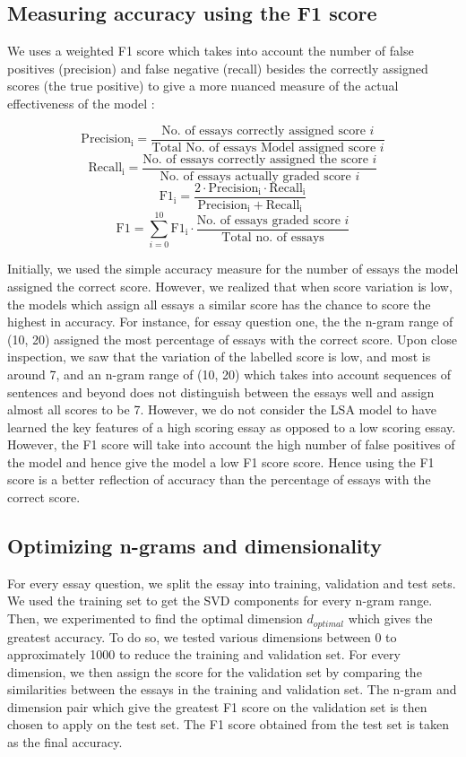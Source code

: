 \documentclass[10pt,letterpaper]{article}
\begin{document}
\subsection{Measuring accuracy using the F1 score}

We uses a weighted F1 score which takes into account the number of false positives (precision) and false negative (recall) besides the correctly assigned scores (the true positive) to give a more nuanced measure of the actual effectiveness of the model \cite{islam2010automated}: 

$$\mathrm{Precision_i} = \frac {\textrm{No. of essays correctly assigned score } i} {\textrm{Total No. of essays Model assigned score } i}$$
$$\mathrm{Recall_i} = \frac{\textrm{No. of essays correctly assigned the score } i}{\textrm{No. of essays actually graded score } i}$$
$$\mathrm{F1_i} = \frac{\mathrm{2 \cdot \mathrm{Precision_i} \cdot \mathrm{Recall_i}}}{\mathrm{Precision_i + Recall_i}}$$
$$\mathrm{F1} = \sum_{i=0}^{10} \mathrm{F1_i} \cdot \frac{\textrm{No. of essays graded score } i} {\textrm{Total no. of essays}}$$


Initially, we used the simple accuracy measure for the number of essays the model assigned the correct score. However, we realized that when score variation is low, the models which assign all essays a similar score has the chance to score the highest in accuracy. For instance, for essay question one, the the n-gram range of (10, 20) assigned the most percentage of essays with the correct score. Upon close inspection, we saw that the variation of the labelled score is low, and most is around 7, and an n-gram range of (10, 20) which takes into account sequences of sentences and beyond does not distinguish between the essays well and assign almost all scores to be 7. However, we do not consider the LSA model to have learned the key features of a high scoring essay as opposed to a low scoring essay. However, the F1 score will take into account the high number of false positives of the model and hence give the model a low F1 score score. Hence using the F1 score is a better reflection of accuracy than the percentage of essays with the correct score. 

\subsection{Optimizing n-grams and dimensionality}

For every essay question, we split the essay into training, validation and test sets. We used the training set to get the SVD components for every n-gram range. Then, we experimented to find the optimal dimension $d_{optimal}$ which gives the greatest accuracy. To do so, we tested various dimensions between 0 to approximately 1000 to reduce the training and validation set. For every dimension, we then assign the score for the validation set by comparing the similarities between the essays in the training and validation set. The n-gram and dimension pair which give the greatest F1 score on the validation set is then chosen to apply on the test set. The F1 score obtained from the test set is taken as the final accuracy. 
\end{document}
